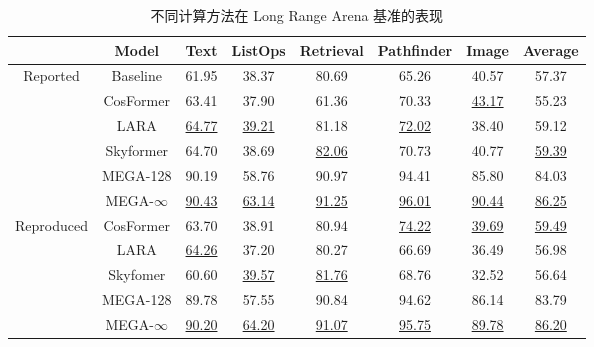 \begin{table}[htbp]
  \centering
  \caption{不同计算方法在 Long Range Arena 基准的表现}
    \begin{tabular}{c|c|cccccc}
    \hline
          & Model & Text  & ListOps & Retrieval & Pathfinder & Image & Average \bigstrut\\
    \hline
    \multirow{6}[4]{*}{Reported} & Baseline & 61.95  & 38.37  & 80.69  & 65.26  & 40.57  & 57.37  \bigstrut[t]\\
          & CosFormer & 63.41  & 37.90  & 61.36  & 70.33  & \underline{43.17} & 55.23  \\
          & LARA  & \underline{64.77} & \underline{39.21} & 81.18  & \underline{72.02} & 38.40  & 59.12  \\
          & Skyformer & 64.70  & 38.69  & \underline{82.06} & 70.73  & 40.77  & \underline{59.39} \bigstrut[b]\\
\cline{2-8}          & MEGA-128 & 90.19  & 58.76  & 90.97  & 94.41  & 85.80  & 84.03  \bigstrut[t]\\
          & MEGA-$\infty$ & \underline{90.43} & \underline{63.14} & \underline{91.25} & \underline{96.01} & \underline{90.44} & \underline{86.25} \bigstrut[b]\\
    \hline
    \multirow{5}[4]{*}{Reproduced} & CosFormer & 63.70  & 38.91  & 80.94  & \underline{74.22} & \underline{39.69} & \underline{59.49} \bigstrut[t]\\
          & LARA  & \underline{64.26} & 37.20  & 80.27  & 66.69  & 36.49  & 56.98  \\
          & Skyfomer & 60.60  & \underline{39.57} & \underline{81.76} & 68.76  & 32.52  & 56.64  \bigstrut[b]\\
\cline{2-8}          & MEGA-128 & 89.78  & 57.55  & 90.84  & 94.62  & 86.14  & 83.79  \bigstrut[t]\\
          & MEGA-$\infty$ & \underline{90.20} & \underline{64.20} & \underline{91.07} & \underline{95.75} & \underline{89.78} & \underline{86.20} \bigstrut[b]\\
    \hline
    \end{tabular}%
  \label{tab:lra_main}%
\end{table}%
